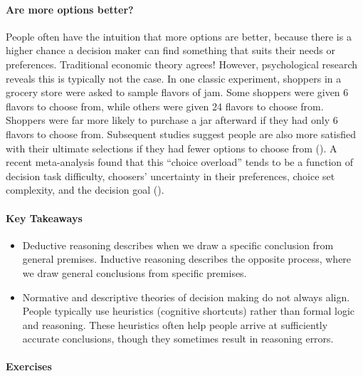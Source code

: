 \documentclass[
]{krantz}
\providecommand{\tightlist}{%
  \setlength{\itemsep}{0pt}\setlength{\parskip}{0pt}}
\begin{document}
\paragraph*{Are more options better?}\label{are-more-options-better}

People often have the intuition that more options are better, because there is a higher chance a decision maker can find something that suits their needs or preferences. Traditional economic theory agrees! However, psychological research reveals this is typically not the case. In one classic experiment, shoppers in a grocery store were asked to sample flavors of jam. Some shoppers were given 6 flavors to choose from, while others were given 24 flavors to choose from. Shoppers were far more likely to purchase a jar afterward if they had only 6 flavors to choose from. Subsequent studies suggest people are also more satisfied with their ultimate selections if they had fewer options to choose from (). A recent meta-analysis found that this ``choice overload'' tends to be a function of decision task difficulty, choosers' uncertainty in their preferences, choice set complexity, and the decision goal ().

\paragraph*{Key Takeaways}\label{key-takeaways-8}

\begin{itemize}
\tightlist
\item
  Deductive reasoning describes when we draw a specific conclusion from general premises. Inductive reasoning describes the opposite process, where we draw general conclusions from specific premises.
\item
  Normative and descriptive theories of decision making do not always align. People typically use heuristics (cognitive shortcuts) rather than formal logic and reasoning. These heuristics often help people arrive at sufficiently accurate conclusions, though they sometimes result in reasoning errors.
\end{itemize}

\paragraph*{Exercises}\label{exercises-8}
\end{document}
